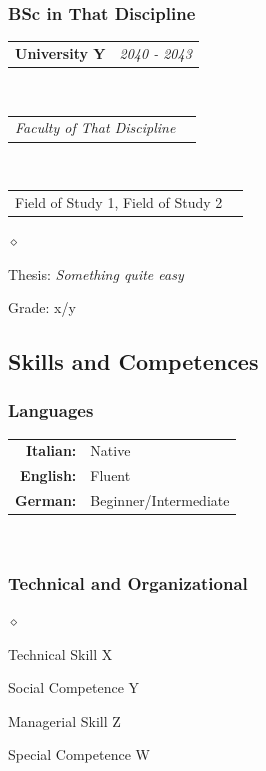 \documentclass[a4paper]{article}
\makeatletter
\newlength{\sectsep}
\newcommand{\headerrow}[2]
{\begin{tabular*}{\textwidth}{l@{\extracolsep{\fill}}r}
    #1 &
    #2 \\
\end{tabular*}}
\renewenvironment{itemize}{
  \begin{list}{$\diamond$}{
    \setlength{\topsep}{0.25em}
    \setlength{\itemsep}{0em}
    \setlength{\parskip}{0pt}
    \setlength{\parsep}{0em}
  }
}{
  \end{list}
}
\makeatother
\begin{document}
      \subsubsection*{BSc in That Discipline}
      \headerrow
        {\textbf{University Y}}{\emph{2040 - 2043}}
      \\
      \headerrow
        {\emph{Faculty of That Discipline}}{}
      \\
      \headerrow
        {Field of Study 1, Field of Study 2}{}

      \begin{itemize}
          \item Thesis: \emph{Something quite easy}
          \item Grade: x/y
      \end{itemize}
      \vfill

      \subsection*{Skills and Competences}
      \subsubsection*{Languages}
      \begin{tabular}{rl}
        \textbf{Italian:}&Native\\
        \textbf{English:}&Fluent\\
        \textbf{German:}&Beginner/Intermediate\\
      \end{tabular} \vspace{1.5ex} \\

      \subsubsection*{Technical and Organizational}
      \begin{itemize}
          \item Technical Skill X
          \item Social Competence Y
          \item Managerial Skill Z
          \item Special Competence W
      \end{itemize}
\end{document}
